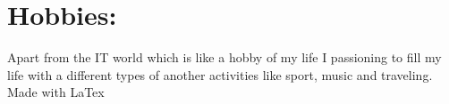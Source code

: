 \documentclass[a4paper,10pt]{article}
\begin{document}
\section*{Hobbies:}
\textnormal{Apart from the IT world which is like a hobby of my life I passioning to fill my life with a different types of another
activities like sport, music and traveling.}
\mbox{}
\vfill
\textcopyright Made with LaTex \the\year{}
\end{document}
